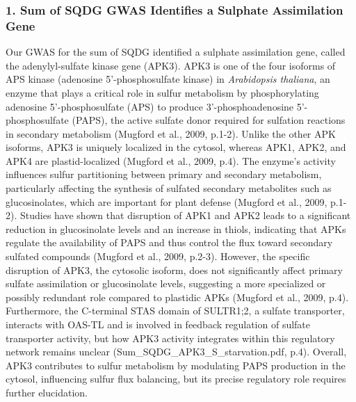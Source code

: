 \documentclass[10pt,letterpaper]{article}
\begin{document}
\begin{itemize}
\subsubsection*{1. Sum of SQDG GWAS Identifies a Sulphate Assimilation Gene}
Our GWAS for the sum of SQDG identified a sulphate assimilation gene, called the adenylyl-sulfate kinase gene (APK3). APK3 is one of the four isoforms of APS kinase (adenosine 5'-phosphosulfate kinase) in \textit{Arabidopsis thaliana}, an enzyme that plays a critical role in sulfur metabolism by phosphorylating adenosine 5'-phosphosulfate (APS) to produce 3'-phosphoadenosine 5'-phosphosulfate (PAPS), the active sulfate donor required for sulfation reactions in secondary metabolism (Mugford et al., 2009, p.1-2). Unlike the other APK isoforms, APK3 is uniquely localized in the cytosol, whereas APK1, APK2, and APK4 are plastid-localized (Mugford et al., 2009, p.4). The enzyme's activity influences sulfur partitioning between primary and secondary metabolism, particularly affecting the synthesis of sulfated secondary metabolites such as glucosinolates, which are important for plant defense (Mugford et al., 2009, p.1-2). Studies have shown that disruption of APK1 and APK2 leads to a significant reduction in glucosinolate levels and an increase in thiols, indicating that APKs regulate the availability of PAPS and thus control the flux toward secondary sulfated compounds (Mugford et al., 2009, p.2-3). However, the specific disruption of APK3, the cytosolic isoform, does not significantly affect primary sulfate assimilation or glucosinolate levels, suggesting a more specialized or possibly redundant role compared to plastidic APKs (Mugford et al., 2009, p.4). Furthermore, the C-terminal STAS domain of SULTR1;2, a sulfate transporter, interacts with OAS-TL and is involved in feedback regulation of sulfate transporter activity, but how APK3 activity integrates within this regulatory network remains unclear (Sum\_SQDG\_APK3\_S\_starvation.pdf, p.4). Overall, APK3 contributes to sulfur metabolism by modulating PAPS production in the cytosol, influencing sulfur flux balancing, but its precise regulatory role requires further elucidation.





\end{itemize}
\end{document}
